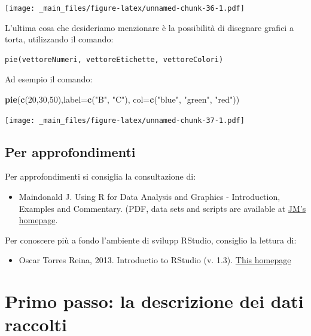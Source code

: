 \documentclass[a4paper,12pt,oneside]{book}
\providecommand{\tightlist}{%
  \setlength{\itemsep}{0pt}\setlength{\parskip}{0pt}}
\newenvironment{Shaded}{\begin{snugshade}}{\end{snugshade}}
\newcommand{\KeywordTok}[1]{\textcolor[rgb]{0.13,0.29,0.53}{\textbf{#1}}}
\newcommand{\DataTypeTok}[1]{\textcolor[rgb]{0.13,0.29,0.53}{#1}}
\newcommand{\DecValTok}[1]{\textcolor[rgb]{0.00,0.00,0.81}{#1}}
\newcommand{\StringTok}[1]{\textcolor[rgb]{0.31,0.60,0.02}{#1}}
\newcommand{\NormalTok}[1]{#1}
\begin{document}
\texttt{[image: \_main\_files/figure-latex/unnamed-chunk-36-1.pdf]}

L'ultima cosa che desideriamo menzionare è la possibilità di disegnare
grafici a torta, utilizzando il comando:

\begin{verbatim}
pie(vettoreNumeri, vettoreEtichette, vettoreColori)
\end{verbatim}

Ad esempio il comando:

\begin{Shaded}
\begin{Highlighting}[]
\KeywordTok{pie}\NormalTok{(}\KeywordTok{c}\NormalTok{(}\DecValTok{20}\NormalTok{,}\DecValTok{30}\NormalTok{,}\DecValTok{50}\NormalTok{),}\DataTypeTok{label=}\KeywordTok{c}\NormalTok{(}\StringTok{"B"}\NormalTok{, }\StringTok{"C"}\NormalTok{),}
        \DataTypeTok{col=}\KeywordTok{c}\NormalTok{(}\StringTok{"blue"}\NormalTok{, }\StringTok{"green"}\NormalTok{, }\StringTok{"red"}\NormalTok{))}
\end{Highlighting}
\end{Shaded}

\texttt{[image: \_main\_files/figure-latex/unnamed-chunk-37-1.pdf]}

\section{Per approfondimenti}\label{per-approfondimenti-1}

Per approfondimenti si consiglia la consultazione di:

\begin{itemize}
\tightlist
\item
  Maindonald J. Using R for Data Analysis and Graphics - Introduction,
  Examples and Commentary. (PDF, data sets and scripts are available at
  \href{https://cran.r-project.org/doc/contrib/usingR.pdff}{JM's
  homepage}.
\end{itemize}

Per conoscere più a fondo l'ambiente di svilupp RStudio, consiglio la
lettura di:

\begin{itemize}
\tightlist
\item
  Oscar Torres Reina, 2013. Introductio to RStudio (v. 1.3).
  \href{https://dss.princeton.edu/training/RStudio101.pdf}{This
  homepage}
\end{itemize}

\chapter{Primo passo: la descrizione dei dati
raccolti}\label{primo-passo-la-descrizione-dei-dati-raccolti}
\end{document}
